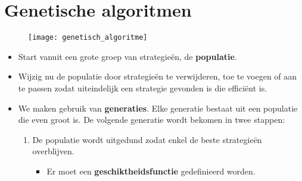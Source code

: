 \section{Genetische algoritmen}
\begin{figure}
	
	\texttt{[image: genetisch\_algoritme]}
\end{figure}
\begin{itemize}
	\item Start vanuit een grote groep van strategieën, de \textbf{populatie}.
	\item Wijzig nu de populatie door strategieën te verwijderen, toe te voegen of aan te passen zodat uiteindelijk een strategie gevonden is die efficiënt is.
	\item We maken gebruik van \textbf{generaties}. Elke generatie bestaat uit een populatie die even groot is. De volgende generatie wordt bekomen in twee stappen:
	\begin{enumerate}
		\item De populatie wordt uitgedund zodat enkel de beste strategieën overblijven.
		\begin{itemize}
			\item Er moet een \textbf{geschiktheidsfunctie} gedefinieerd worden.
			

\end{itemize}
\end{enumerate}
\end{itemize}
